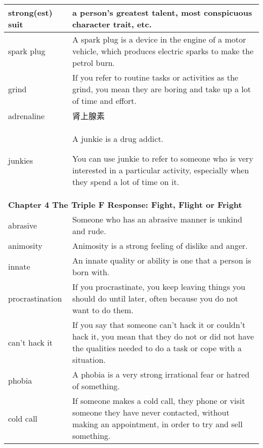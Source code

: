 \documentclass{article}
\begin{document}
\begin{center}
\begin{longtable}{|l|p{9cm}|}
\hline
strong(est) suit
&
a person's greatest talent, most conspicuous character trait, etc.
\\

\hline
spark plug
&
A spark plug is a device in the engine of a motor vehicle, which produces electric sparks to make the petrol burn.
\\

\hline
grind
&
If you refer to routine tasks or activities as the grind, you mean they are boring and take up a lot of time and effort.
\\

\hline
adrenaline
&
肾上腺素
\\

\hline
junkies
&
A junkie is a drug addict.
\par
You can use junkie to refer to someone who is very interested in a particular activity, especially when they spend a lot of time on it.
\\

\hline
\multicolumn{2}{|l|}{\textbf{Chapter 4 The Triple F Response: Fight, Flight or Fright}}\\

\hline
abrasive
&
Someone who has an abrasive manner is unkind and rude.
\\

\hline
animosity
&
Animosity is a strong feeling of dislike and anger.
\\

\hline
innate
&
An innate quality or ability is one that a person is born with.
\\

\hline
procrastination
&
If you procrastinate, you keep leaving things you should do until later, often because you do not want to do them.
\\

\hline
can't hack it
&
If you say that someone can't hack it or couldn't hack it, you mean that they do not or did not have the qualities needed to do a task or cope with a situation.
\\

\hline
phobia
&
A phobia is a very strong irrational fear or hatred of something.
\\

\hline
cold call
&
If someone makes a cold call, they phone or visit someone they have never contacted, without making an appointment, in order to try and sell something.
\\


\end{longtable}
\end{center}
\end{document}
